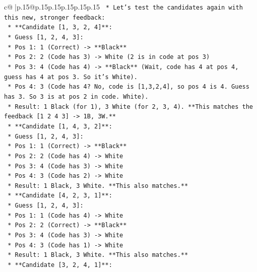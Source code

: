 \documentclass{article}
\begin{document}
{\begin{supertabular}{c@{$\;$}|p{.15\linewidth}@{}p{.15\linewidth}p{.15\linewidth}p{.15\linewidth}p{.15\linewidth}p{.15\linewidth}}
{{{\texttt{    *   Let's test the candidates again with this new, stronger feedback:} \\
\texttt{        *   **Candidate {[}1, 3, 2, 4{]}**:} \\
\texttt{            *   Guess {[}1, 2, 4, 3{]}:} \\
\texttt{                *   Pos 1: 1 (Correct) {-}> **Black**} \\
\texttt{                *   Pos 2: 2 (Code has 3) {-}> White (2 is in code at pos 3)} \\
\texttt{                *   Pos 3: 4 (Code has 4) {-}> **Black** (Wait, code has 4 at pos 4, guess has 4 at pos 3. So it's White).} \\
\texttt{                *   Pos 4: 3 (Code has 4? No, code is {[}1,3,2,4{]}, so pos 4 is 4. Guess has 3. So 3 is at pos 2 in code. White).} \\
\texttt{                *   Result: 1 Black (for 1), 3 White (for 2, 3, 4). **This matches the feedback {[}1 2 4 3{]} {-}> 1B, 3W.**} \\
\texttt{        *   **Candidate {[}1, 4, 3, 2{]}**:} \\
\texttt{            *   Guess {[}1, 2, 4, 3{]}:} \\
\texttt{                *   Pos 1: 1 (Correct) {-}> **Black**} \\
\texttt{                *   Pos 2: 2 (Code has 4) {-}> White} \\
\texttt{                *   Pos 3: 4 (Code has 3) {-}> White} \\
\texttt{                *   Pos 4: 3 (Code has 2) {-}> White} \\
\texttt{                *   Result: 1 Black, 3 White. **This also matches.**} \\
\texttt{        *   **Candidate {[}4, 2, 3, 1{]}**:} \\
\texttt{            *   Guess {[}1, 2, 4, 3{]}:} \\
\texttt{                *   Pos 1: 1 (Code has 4) {-}> White} \\
\texttt{                *   Pos 2: 2 (Correct) {-}> **Black**} \\
\texttt{                *   Pos 3: 4 (Code has 3) {-}> White} \\
\texttt{                *   Pos 4: 3 (Code has 1) {-}> White} \\
\texttt{                *   Result: 1 Black, 3 White. **This also matches.**} \\
\texttt{        *   **Candidate {[}3, 2, 4, 1{]}**:} \\
}}}
\end{supertabular}}
\end{document}
